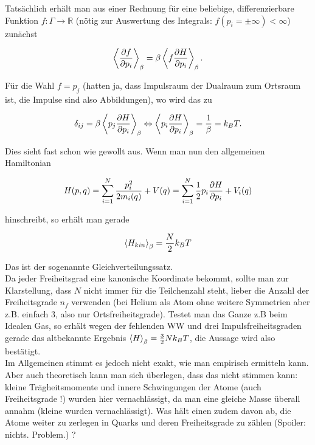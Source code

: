\documentclass[../KlassMech_main.tex]{subfiles}
\begin{document}
Tatsächlich erhält man aus einer Rechnung für eine beliebige, differenzierbare Funktion $f: \Gamma \rightarrow \mathbb{R}$ (nötig zur Auswertung des Integrals: $f(p_i = \pm\infty) < \infty$) zunächst

\begin{equation}\label{key}
\expval{\pdv{f}{p_i}}_\beta = \beta \expval{f \pdv{H}{p_i}}_\beta .
\end{equation}

Für die Wahl $f = p_j$ (hatten ja, dass Impulsraum der Dualraum zum Ortsraum ist, die Impulse sind also Abbildungen), wo wird das zu

\begin{equation}\label{key}
\delta_{ij} = \beta \expval{p_j \pdv{H}{p_i}}_\beta \Leftrightarrow \expval{p_i \pdv{H}{p_i}}_\beta = \frac{1}{\beta} = k_B T .
\end{equation}

Dies sieht fast schon wie gewollt aus. Wenn man nun den allgemeinen Hamiltonian

\begin{equation}\label{key}
H(p,q) = \sum\limits_{i=1}^N \frac{p_i^2}{2 m_i(q)} + V(q) = \sum\limits_{i=1}^N \frac{1}{2} p_i \pdv{H}{p_i} + V_i(q)
\end{equation}

hinschreibt, so erhält man gerade

\begin{equation}\label{key}
\expval{H_{kin}}_\beta = \frac{N}{2} k_B T
\end{equation}

	\smallskip

Das ist der sogenannte Gleichverteilungssatz.\\

Da jeder Freiheitsgrad eine kanonische Koordinate bekommt, sollte man zur Klarstellung, dass $N$ nicht immer für die Teilchenzahl steht, lieber die Anzahl der Freiheitsgrade $n_f$ verwenden (bei Helium als Atom ohne weitere Symmetrien aber z.B. einfach 3, also nur Ortsfreiheitsgrade). Testet man das Ganze z.B beim Idealen Gas, so erhält wegen der fehlenden WW und drei Impulsfreiheitsgraden gerade das altbekannte Ergebnis $\expval{H}_\beta = \frac{3}{2} N k_B T$, die Aussage wird also bestätigt.\\
Im Allgemeinen stimmt es jedoch nicht exakt, wie man empirisch ermitteln kann. Aber auch theoretisch kann man sich überlegen, dass das nicht stimmen kann: kleine Trägheitsmomente und innere Schwingungen der Atome (auch Freiheitsgrade !) wurden hier vernachlässigt, da man eine gleiche Masse überall annahm (kleine wurden vernachlässigt). Was hält einen zudem davon ab, die Atome weiter zu zerlegen in Quarks und deren Freiheitsgrade zu zählen (Spoiler: nichts. Problem.) ?
\end{document}
